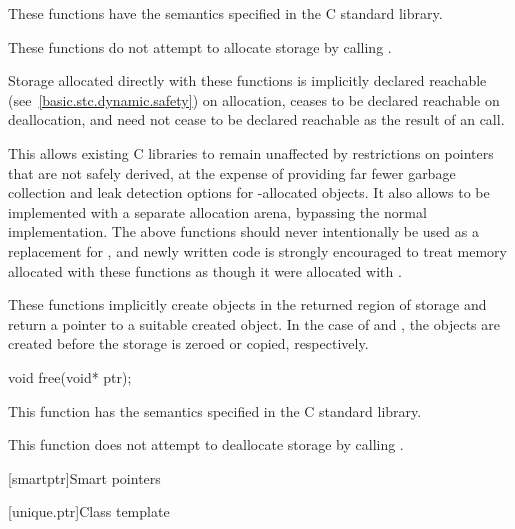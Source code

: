 \begin{itemdescr}
\pnum
\effects
These functions have the semantics specified in the C standard library.

\pnum
\remarks
These functions do not attempt to allocate
storage by calling .
%

\pnum
Storage allocated directly with these functions
is implicitly declared reachable
(see~\ref{basic.stc.dynamic.safety}) on allocation, ceases to be declared
reachable on deallocation, and need not cease to be declared reachable as the
result of an  call.
\begin{note}
This allows existing
C libraries to remain unaffected by restrictions on pointers that are not safely
derived, at the expense of providing far fewer garbage collection and leak
detection options for -allocated objects. It also allows
 to be implemented with a separate allocation arena, bypassing
the normal  implementation. The above functions
should never intentionally be used as a replacement for
, and newly written code is strongly encouraged to
treat memory allocated with these functions as though it were allocated with
.
\end{note}

\pnum
These functions implicitly create objects
in the returned region of storage and
return a pointer to a suitable created object.
In the case of  and ,
the objects are created before the storage is zeroed or copied, respectively.
\end{itemdescr}

%
\begin{itemdecl}
void free(void* ptr);
\end{itemdecl}

\begin{itemdescr}
\pnum
\effects
This function has the semantics specified in the C standard library.

\pnum
\remarks
This function does not attempt to
deallocate storage by calling
.
\end{itemdescr}


[smartptr]{Smart pointers}

[unique.ptr]{Class template }

